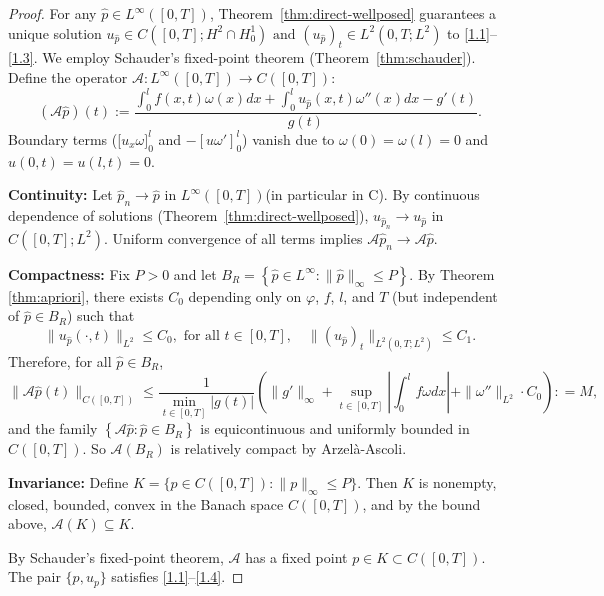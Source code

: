 \documentclass[reqno]{amsart}
\begin{document}
\begin{proof}
For any $\hat{p} \in L^{\infty}([0,T])$, Theorem~\ref{thm:direct-wellposed} guarantees a unique solution $u_{\hat{p}} \in  C([0,T];H^2 \cap H_0^1) \text{ and } (u_{\hat{p}})_t \in L^2(0,T;L^2)$ to \eqref{1.1}--\eqref{1.3}.
We employ Schauder's fixed-point theorem (Theorem~\ref{thm:schauder}).
Define the operator $\mathcal{A}: L^{\infty}([0,T]) \to C([0,T])$:
\[
(\mathcal{A}\hat{p})(t) := \frac{ \int_0^l f(x,t)\omega(x)  dx + \int_0^l u_{\hat{p}}(x,t)\omega''(x)  dx - g'(t) }{ g(t) }.
\]
Boundary terms ([$u_x\omega]_0^l$  and $-[u\omega']_0^l$) vanish due to $\omega(0) = \omega(l) = 0$ and $u(0,t)=u(l,t)=0$.

\textbf{Continuity:} Let $\hat{p}_n \to \hat{p}$ in $L^{\infty}([0,T])$(in particular in C). By continuous dependence of solutions (Theorem~\ref{thm:direct-wellposed}), $u_{\hat{p}_n} \to u_{\hat{p}}$ in $C([0,T];L^2)$. Uniform convergence of all terms implies $\mathcal{A}\hat{p}_n \to \mathcal{A}\hat{p}$.

\textbf{Compactness:} Fix $P > 0$ and let $B_R = \left\{\hat{p} \in L^{\infty} : \|\hat{p}\|_{\infty} \leq P \right\}$. By Theorem \ref{thm:apriori}, there exists $C_0$ depending only on $\varphi$, $f$, $l$, and $T$ (but independent of $\hat{p} \in B_R$) such that
\[
\|u_{\hat{p}}(\cdot,t)\|_{L^2} \leq C_0, \text{ for all } t \in [0,T], \quad \|(u_{\hat{p}})_t\|_{L^2(0,T;L^2)} \leq C_1. 
\]
Therefore, for all $\hat{p} \in B_R$,
\[
\|\mathcal{A}\hat{p}(t)\|_{C([0,T])} \leq \frac{1}{\min_{t \in [0,T]} |g(t)|} \left( \|g'\|_\infty + \sup_{t \in [0,T]} \left|\int_0^l f\omega  dx\right| + \|\omega''\|_{L^2} \cdot C_0 \right)  : = M,
\]
and the family $\left \{\mathcal{A}\hat{p}:  \hat{p} \in B_R \right \}$ is equicontinuous and uniformly bounded in $C([0,T])$. So $\mathcal{A}(B_R)$ is relatively compact by Arzelà-Ascoli.

\textbf{Invariance:} Define $K = \{ p \in C([0,T]) : \|p\|_\infty \leq P \}$.
Then $K$ is nonempty, closed, bounded, convex in the Banach space 
$C([0,T])$, and by the bound above, $\mathcal{A}(K) \subseteq K$.

By Schauder's fixed-point theorem, $\mathcal{A}$ has a fixed point $p \in K \subset C([0, T])$. The pair $\{p, u_p\}$ satisfies \eqref{1.1}–\eqref{1.4}.
\end{proof}
\end{document}
